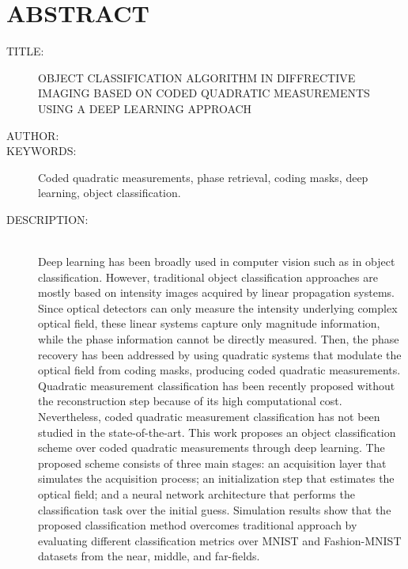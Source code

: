 
\chapter*{ABSTRACT}

\footnotesize{
\begin{description}
  \item[TITLE:] OBJECT CLASSIFICATION ALGORITHM IN DIFFRECTIVE IMAGING BASED ON CODED QUADRATIC MEASUREMENTS USING A DEEP LEARNING APPROACH
  \item[AUTHOR:] \MakeUppercase{\autor} 
  \item[KEYWORDS:] Coded quadratic measurements, phase retrieval, coding masks, deep learning, object classification.
  \item[DESCRIPTION:]\hfill \\ Deep learning has been broadly used in computer vision such as in object classification. However, traditional object classification approaches are mostly based on intensity images acquired by linear propagation systems. Since optical detectors can only measure the intensity underlying complex optical field, these linear systems capture only magnitude information, while the phase information cannot be directly measured. Then, the phase recovery has been addressed by using quadratic systems that modulate the optical field from coding masks, producing coded quadratic measurements. Quadratic measurement classification has been recently proposed without the reconstruction step because of its high computational cost. Nevertheless, coded quadratic measurement classification has not been studied in the state-of-the-art.  This work proposes an object classification scheme over coded quadratic measurements through deep learning. The proposed scheme consists of three main stages: an acquisition layer that simulates the acquisition process; an initialization step that estimates the optical field; and a neural network architecture that performs the classification task over the initial guess. Simulation results show that the proposed classification method overcomes traditional approach by evaluating different classification metrics over MNIST and Fashion-MNIST datasets from the near, middle, and far-fields.
\end{description}}\normalsize
